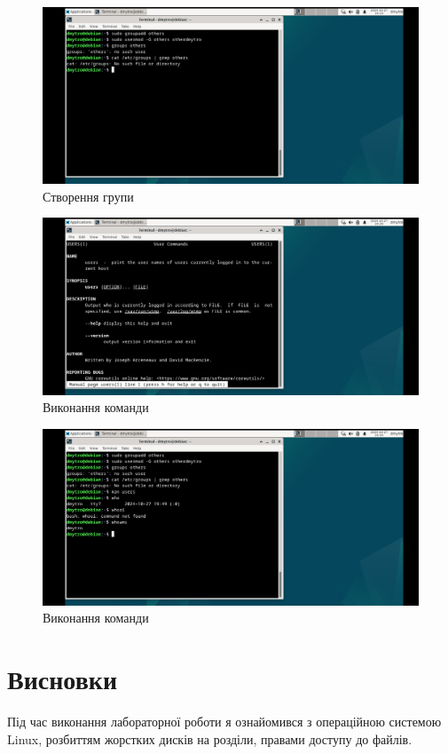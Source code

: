 \documentclass[oneside,14pt]{extarticle}
\begin{document}
\begin{normalsize}
	\begin{figure}[H]
		\centering
		\includegraphics[width=\columnwidth]{4}
		\caption{Створення групи}
	\end{figure}
	
		\begin{figure}[H]
		\centering
		\includegraphics[width=\columnwidth]{5}
		\caption{Виконання команди }
	\end{figure}
	
		\begin{figure}[H]
		\centering
		\includegraphics[width=\columnwidth]{6}
		\caption{Виконання команди }
	\end{figure}
	\section*{Висновки}
	Під час виконання лабораторної роботи я ознайомився з операційною системою Linux, розбиттям
	жорстких дисків на розділи, правами доступу до файлів.
		    
\end{normalsize}
\end{document}
